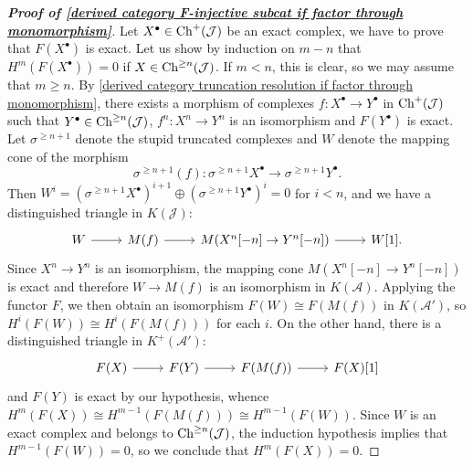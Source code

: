 \begin{proof}[\textbf{Proof of \cref{derived category F-injective subcat if factor through monomorphism}}]
Let $X^\bullet\in\mathrm{Ch}^+(\mathcal{J})$ be an exact complex, we have to prove that $F(X^\bullet)$ is exact. Let us show by induction on $m-n$ that $H^m(F(X^\bullet))=0$ if $X\in\mathrm{Ch}^{\geq n}(\mathcal{J})$. If $m<n$, this is clear, so we may assume that $m\geq n$. By \cref{derived category truncation resolution if factor through monomorphism}, there exists a morphism of complexes $f:X^\bullet\to Y^\bullet$ in $\mathrm{Ch}^+(\mathcal{J})$ such that $Y^\bullet\in\mathrm{Ch}^{\geq n}(\mathcal{J})$, $f^n:X^n\to Y^n$ is an isomorphism and $F(Y^\bullet)$ is exact. Let $\sigma^{\geq n+1}$ denote the stupid truncated complexes and $W$ denote the mapping cone of the morphism
\[\sigma^{\geq n+1}(f):\sigma^{\geq n+1}X^\bullet\to \sigma^{\geq n+1}Y^\bullet.\]
Then $W^i=(\sigma^{\geq n+1}X^\bullet)^{i+1}\oplus(\sigma^{\geq n+1}Y^\bullet)^i=0$ for $i<n$, and we have a distinguished triangle in $K(\mathcal{J})$:
\[\begin{tikzcd}
W\ar[r]&M(f)\ar[r]&M(X^n[-n]\to Y^n[-n])\ar[r]&W[1].
\end{tikzcd}\]
Since $X^n\to Y^n$ is an isomorphism, the mapping cone $M(X^n[-n]\to Y^n[-n])$ is exact and therefore $W\to M(f)$ is an isomorphism in $K(\mathcal{A})$. Applying the functor $F$, we then obtain an isomorphism $F(W)\cong F(M(f))$ in $K(\mathcal{A}')$, so $H^i(F(W))\cong H^i(F(M(f)))$ for each $i$. On the other hand, there is a distinguished triangle in $K^+(\mathcal{A}')$:
\[\begin{tikzcd}
F(X)\ar[r]&F(Y)\ar[r]&F(M(f))\ar[r]&F(X)[1]
\end{tikzcd}\]
and $F(Y)$ is exact by our hypothesis, whence $H^m(F(X))\cong H^{m-1}(F(M(f)))\cong H^{m-1}(F(W))$. Since $W$ is an exact complex and belongs to $\mathrm{Ch}^{\geq n}(\mathcal{J})$, the induction hypothesis implies that $H^{m-1}(F(W))=0$, so we conclude that $H^m(F(X))=0$. 
\end{proof}

